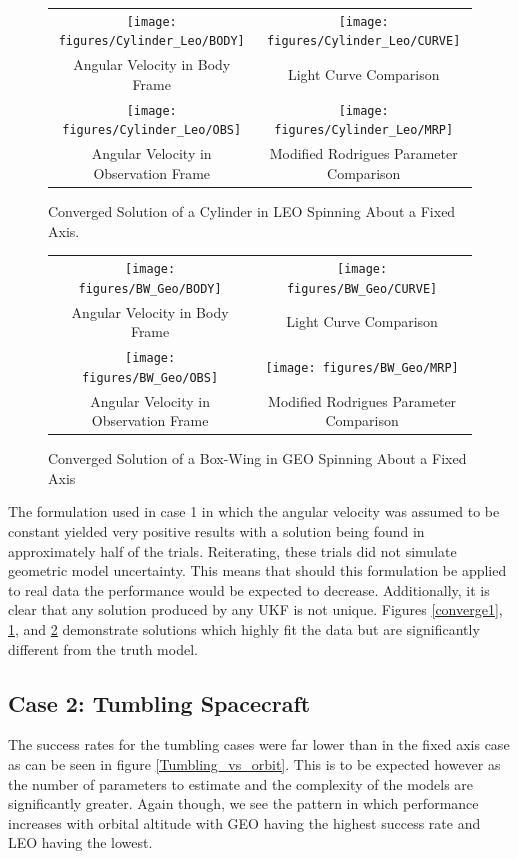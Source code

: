 \begin{figure}[H]
	\begin{tabular}{cc}
		\texttt{[image: figures/Cylinder\_Leo/BODY]} &
		\texttt{[image: figures/Cylinder\_Leo/CURVE]} \\
		Angular Velocity in Body Frame & Light Curve Comparison \\
		\texttt{[image: figures/Cylinder\_Leo/OBS]} &
		\texttt{[image: figures/Cylinder\_Leo/MRP]} \\
		Angular Velocity in Observation Frame & Modified Rodrigues Parameter Comparison
	\end{tabular}
	\caption{Converged Solution of a Cylinder in LEO Spinning About a Fixed Axis.}
	\label{converge2}
\end{figure}

\begin{figure}[H]
	\begin{tabular}{cc}
		\texttt{[image: figures/BW\_Geo/BODY]} &
		\texttt{[image: figures/BW\_Geo/CURVE]} \\
		Angular Velocity in Body Frame & Light Curve Comparison \\
		\texttt{[image: figures/BW\_Geo/OBS]} &
		\texttt{[image: figures/BW\_Geo/MRP]} \\
		Angular Velocity in Observation Frame & Modified Rodrigues Parameter Comparison
	\end{tabular}
	\caption{Converged Solution of a Box-Wing in GEO Spinning About a Fixed Axis}
	\label{converge3}
\end{figure}


The formulation used in case 1 in which the angular velocity was assumed to be constant yielded very positive results with a solution being found in approximately half of the trials. Reiterating, these trials did not simulate geometric model uncertainty. This means that should this formulation be applied to real data the performance would be expected to decrease. Additionally, it is clear that any solution produced by any UKF is not unique. Figures \ref{converge1}, \ref{converge2}, and \ref{converge3} demonstrate solutions which highly fit the data but are significantly different from the truth model.


\subsection{Case 2: Tumbling Spacecraft}

The success rates for the tumbling cases were far lower than in the fixed axis case as can be seen in figure \ref{Tumbling_vs_orbit}. This is to be expected however as the number of parameters to estimate and the complexity of the models are significantly greater. Again though, we see the pattern in which performance increases with orbital altitude with GEO having the highest success rate and LEO having the lowest.

